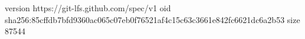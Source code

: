version https://git-lfs.github.com/spec/v1
oid sha256:85cffdb7bfd9360ac065c07eb0f76521af4c15c63c3661e842fc6621dc6a2b53
size 87544
